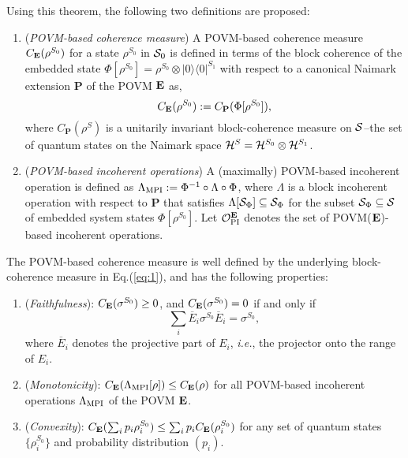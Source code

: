\documentclass[american,aps,pra,reprint, superscriptaddress]{revtex4-1}
\def\be{\begin{equation}}
\def\ee{\end{equation}}
\def\ot{\otimes}
\theoremstyle{plain}
\newcommand{\out}[2]{| #1\rangle\langle #2 |}
\def\bP{\mathbf{P}}\def\bQ{\mathbf{Q}}\def\bR{\mathbf{R}}\def\bS{\mathbf{S}}\def\bT{\mathbf{T}}
\theoremstyle{definition}
\theoremstyle{remark}
\begin{document}
Using this theorem, the following two definitions are proposed:
\begin{enumerate}[D1]
        \item (\emph{POVM-based coherence measure}) A POVM-based coherence measure $C_{\mathbf{E}}(\rho^{S_0})$ for a state $\rho^{S_0}$ in $\mathcal{S}_0$ is defined in terms of the block coherence of the embedded state $\Phi[\rho^{S_0}] = \rho^{S_0}\ot \out{0}{0}^{S_1}$ with respect to a canonical Naimark extension $\bP$ of the POVM $\mathbf{E}$ as,
\be\label{eq:1}
C_{\bE}(\rho^{S_0}) := C_{\bP}(\Phi[\rho^{S_0}]),
\ee
where $C_{\bP}(\rho^{S})$ is a unitarily invariant block-coherence measure on $\mathcal{S}$--the set of quantum states on the Naimark space $\cH^S = \cH^{S_0}\ot \cH^{S_1}$.

     \item\label{df:2} (\emph{POVM-based incoherent operations}) A (maximally) POVM-based incoherent operation is defined as $\Lambda_{\textmd{MPI}} := \Phi^{-1}\circ \Lambda\circ \Phi$, where $\Lambda$ is a block incoherent operation  with respect to $\bP$ that satisfies $\Lambda[\mathcal{S}_{\Phi}] \subseteq \mathcal{S}_{\Phi}$
 for the subset $\mathcal{S}_{\Phi} \subseteq \mathcal{S}$ of embedded system states $\Phi[\rho^{S_0}]$. Let $\mathcal{O}_{\textmd{PI}}^{\mathbf{E}}$ denotes the set of POVM($\mathbf{E}$)-based incoherent operations.
\end{enumerate}

The POVM-based coherence measure is well defined by the underlying block-coherence measure in Eq.(\ref{eq:1}), and has the following properties:
\begin{enumerate}[P1]
        \item (\emph{Faithfulness}): $C_{\mathbf{E}}(\sigma^{S_0}) \geq 0$, and $C_{\mathbf{E}}(\sigma^{S_0}) = 0$ if and only if
\be\label{eq:2}
\sum_i\overline{E}_i\sigma^{S_0}\overline{E}_i = \sigma^{S_0},
\ee
where $\overline{E}_i$ denotes the projective part of $E_i$, \emph{i.e.}, the projector onto the range of $E_i$.
     \item (\emph{Monotonicity}):  $C_{\mathbf{E}}(\Lambda_{\textmd{MPI}}[\rho])\leq C_{\mathbf{E}}(\rho)$ for all POVM-based incoherent
operations $\Lambda_{\textmd{MPI}}$ of the POVM $\mathbf{E}$.
     \item (\emph{Convexity}): $C_{\mathbf{E}}(\sum_i p_i \rho_i^{S_0}) \leq \sum_i p_i C_{\mathbf{E}}(\rho_i^{S_0})$ for any set of quantum states $\{\rho_i^{S_0}\}$ and probability distribution $(p_i)$.
\end{enumerate}
\end{document}
